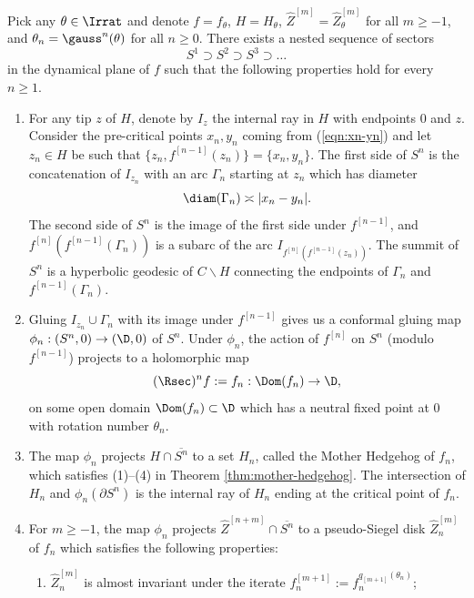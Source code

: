\documentclass{amsart}
\begin{document}
\begin{theorem}
\label{thm:sectorial-bounds}
    Pick any $\theta \in \Irrat$ and denote $f=f_{\theta}$, $H=H_{\theta}$, $\hat{Z}^{[m]} = \hat{Z}^{[m]}_\theta$ for all $m \geq -1$, and $\theta_n = \gauss^n(\theta)$ for all $n \geq 0$.
    There exists a nested sequence of sectors 
    \[
    S^1 \supset S^2 \supset S^3 \supset \ldots
    \]
    in the dynamical plane of $f$ such that the following properties hold for every $n \geq 1$.
\begin{enumerate}
    \item For any tip $z$ of $H$, denote by $I_z$ the internal ray in $H$ with endpoints $0$ and $z$.
    Consider the pre-critical points $x_n, y_n$ coming from (\ref{eqn:xn-yn})
    and let $z_n \in H$ be such that $\{z_n, f^{[n-1]}(z_n)\} = \{x_n,y_n\}$.
    The first side of $S^n$ is the concatenation of $I_{z_n}$ with an arc $\Gamma_n$ starting at $z_n$ which has diameter 
    \[
        \diam(\Gamma_n) \asymp |x_n - y_n|.
    \] 
    The second side of $S^n$ is the image of the first side under $f^{[n-1]}$, and $f^{[n]}(f^{[n-1]}(\Gamma_n))$ is a subarc of the arc $I_{f^{[n]}(f^{[n-1]}(z_n))}$.
    The summit of $S^n$ is a hyperbolic geodesic of $C \backslash H$ connecting the endpoints of $\Gamma_n$ and $f^{[n-1]}(\Gamma_n)$.
    \item Gluing $I_{z_n} \cup \Gamma_n$ with its image under $f^{[n-1]}$ gives us a conformal gluing map $\phi_n: (S^n,0) \to (\D,0)$ of $S^n$. 
    Under $\phi_n$, the action of $f^{[n]}$ on $S^n$ (modulo $f^{[n-1]}$) projects to a holomorphic map 
    \[
        (\Rsec)^n f := f_n: \Dom(f_n) \to \D,
    \]
    on some open domain $\Dom(f_n) \subset \D$ which has a neutral fixed point at $0$ with rotation number $\theta_n$.
    \item The map $\phi_n$ projects $H \cap \overline{S^n}$ to a set $H_n$, called the Mother Hedgehog of $f_n$, which satisfies \textnormal{(1)--(4)} in Theorem \ref{thm:mother-hedgehog}. 
    The intersection of $H_n$ and $\phi_n(\partial S^n)$ is the internal ray of $H_n$ ending at the critical point of $f_n$.
    \item For $m \geq -1$, the map $\phi_n$ projects $\hat{Z}^{[n+m]} \cap \overline{S^n}$ to a pseudo-Siegel disk $\hat{Z}^{[m]}_n$ of $f_n$ which satisfies the following properties:
    \begin{enumerate}[label=\textnormal{(\alph*)}]
        \item $\hat{Z}^{[m]}_n$ is almost invariant under the iterate $f^{[m+1]}_n := f_n^{q_{[m+1]}(\theta_n)}$;

\end{enumerate}
\end{enumerate}
\end{theorem}
\end{document}
